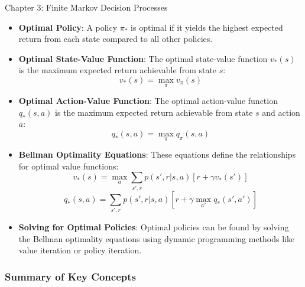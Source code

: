 \begin{notes}{Chapter 3: Finite Markov Decision Processes}
\begin{highlight}
        \begin{itemize}
            \item \textbf{Optimal Policy}: A policy \(\pi_*\) is optimal if it yields the highest expected return from each state compared to all other policies.
            \item \textbf{Optimal State-Value Function}: The optimal state-value function \(v_*(s)\) is the maximum expected return achievable from state \(s\):
            \[
            v_*(s) = \max_{\pi} v_{\pi}(s)
            \]
            \item \textbf{Optimal Action-Value Function}: The optimal action-value function \(q_*(s, a)\) is the maximum expected return achievable from state \(s\) and action \(a\):
            \[
            q_*(s, a) = \max_{\pi} q_{\pi}(s, a)
            \]
            \item \textbf{Bellman Optimality Equations}: These equations define the relationships for optimal value functions:
            \[
            v_*(s) = \max_{a} \sum_{s', r} p(s', r | s, a) \left[ r + \gamma v_*(s') \right]
            \]
            \[
            q_*(s, a) = \sum_{s', r} p(s', r | s, a) \left[ r + \gamma \max_{a'} q_*(s', a') \right]
            \]
            \item \textbf{Solving for Optimal Policies}: Optimal policies can be found by solving the Bellman optimality equations using dynamic programming methods like value iteration or policy iteration.
        \end{itemize}
    
    \end{highlight}
    
    \subsubsection*{Summary of Key Concepts}
    
    \begin{highlight}
    

\end{highlight}
\end{notes}
